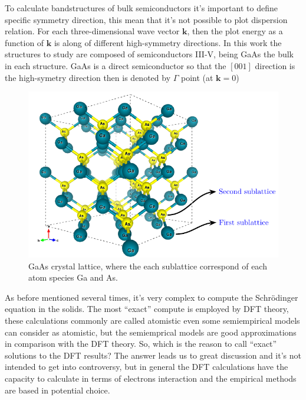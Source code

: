 To calculate bandstructures of bulk semiconductors it's important to define specific symmetry direction, this mean that it's not possible to plot dispersion relation. For each three-dimensional wave vector $\boldsymbol{k}$, then the plot energy as a function of $\boldsymbol{k}$ is along of different high-symmetry directions\cite{piprek2017handbook}.  
In this work the structures to study are composed of semiconductors III-V, being GaAs the bulk in each structure.  GaAs is a direct semiconductor so that the $\left[001\right]$ direction is the high-symetry direction then is denoted by $\Gamma$ point (at $\boldsymbol{k}=0$)
\begin{figure}[h!]
	\centering
	\includegraphics[width=\linewidth]{../figures/chapter-1/bulk-1/build/bulk-1}
	\caption{
		 GaAs crystal lattice, where the each sublattice correspond of each atom species Ga and As. }
	\label{fig:subsubsection-1.1.1-bulk-1}
\end{figure}


As before mentioned several times, it's very complex to compute the Schrödinger equation in the solids. The most ``exact'' compute is employed by DFT theory,  these calculations commonly are called atomistic even some  semiempirical models can consider as atomistic, but the semiemprical models are good approximations in comparison with the DFT theory. So, which is the reason to call ``exact'' solutions to the DFT results? The answer leads us to great discussion and  it's not intended to get into controversy,  but in general the DFT calculations have the capacity to calculate in terms of electrons interaction and the empirical methods are based in potential choice.\\
 
